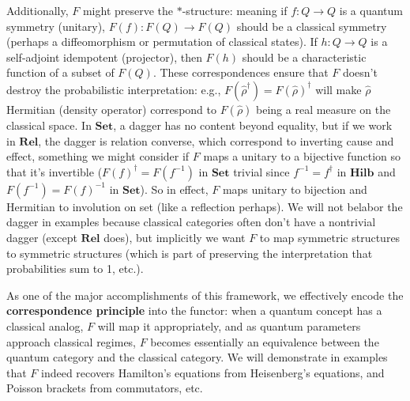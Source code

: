 Additionally, $F$ might preserve the $*$-structure: meaning if $f: Q \to Q$ is a quantum symmetry (unitary), $F(f): F(Q) \to F(Q)$ should be a classical symmetry (perhaps a diffeomorphism or permutation of classical states). If $h: Q \to Q$ is a self-adjoint idempotent (projector), then $F(h)$ should be a characteristic function of a subset of $F(Q)$. These correspondences ensure that $F$ doesn’t destroy the probabilistic interpretation: e.g., $F(\hat{\rho}^\dagger) = F(\hat{\rho})^\dagger$ will make $\hat{\rho}$ Hermitian (density operator) correspond to $F(\hat{\rho})$ being a real measure on the classical space. In $\mathbf{Set}$, a dagger has no content beyond equality, but if we work in $\mathbf{Rel}$, the dagger is relation converse, which correspond to inverting cause and effect, something we might consider if $F$ maps a unitary to a bijective function so that it’s invertible ($F(f)^\dagger = F(f^{-1})$ in $\mathbf{Set}$ trivial since $f^{-1} = f^\dagger$ in $\mathbf{Hilb}$ and $F(f^{-1}) = F(f)^{-1}$ in $\mathbf{Set}$). So in effect, $F$ maps unitary to bijection and Hermitian to involution on set (like a reflection perhaps). We will not belabor the dagger in examples because classical categories often don’t have a nontrivial dagger (except $\mathbf{Rel}$ does), but implicitly we want $F$ to map symmetric structures to symmetric structures (which is part of preserving the interpretation that probabilities sum to 1, etc.).

As one of the major accomplishments of this framework, we effectively encode the \textbf{correspondence principle} into the functor: when a quantum concept has a classical analog, $F$ will map it appropriately, and as quantum parameters approach classical regimes, $F$ becomes essentially an equivalence between the quantum category and the classical category. We will demonstrate in examples that $F$ indeed recovers Hamilton’s equations from Heisenberg’s equations, and Poisson brackets from commutators, etc.

